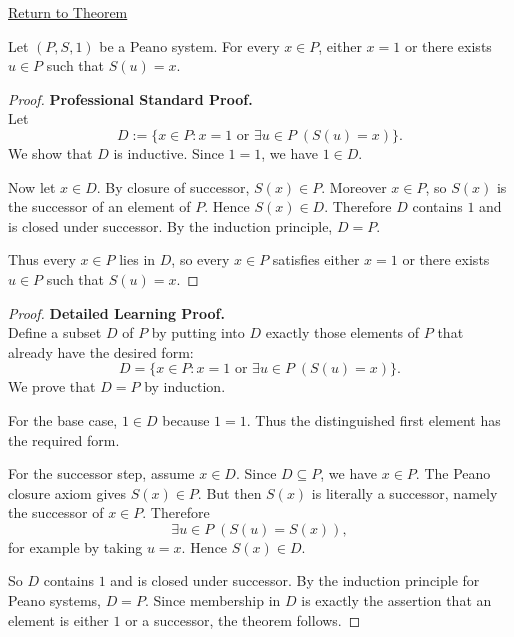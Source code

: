 \newpage
{}
\label{prf:every-element-is-one-or-a-successor}

\begin{remark*}[Return]
\hyperref[thm:every-element-is-one-or-a-successor]{Return to Theorem}
\end{remark*}

\begin{theorem*}
Let $(P,S,1)$ be a Peano system. For every $x \in P$, either $x=1$ or there
exists $u \in P$ such that $S(u)=x$.
\end{theorem*}

\begin{proof}
\textbf{Professional Standard Proof.}~\\
Let
\[
D:=\{x\in P:x=1 \text{ or } \exists u\in P\;(S(u)=x)\}.
\]
We show that $D$ is inductive. Since $1=1$, we have $1\in D$.

Now let $x\in D$. By closure of successor, $S(x)\in P$. Moreover $x\in P$,
so $S(x)$ is the successor of an element of $P$. Hence $S(x)\in D$.
Therefore $D$ contains $1$ and is closed under successor. By the induction
principle, $D=P$.

Thus every $x\in P$ lies in $D$, so every $x\in P$ satisfies either $x=1$ or
there exists $u\in P$ such that $S(u)=x$.
\end{proof}

\begin{proof}
\textbf{Detailed Learning Proof.}~\\
Define a subset $D$ of $P$ by putting into $D$ exactly those elements of $P$
that already have the desired form:
\[
D=\{x\in P:x=1 \text{ or } \exists u\in P\;(S(u)=x)\}.
\]
We prove that $D=P$ by induction.

For the base case, $1\in D$ because $1=1$. Thus the distinguished first
element has the required form.

For the successor step, assume $x\in D$. Since $D\subseteq P$, we have
$x\in P$. The Peano closure axiom gives $S(x)\in P$. But then $S(x)$ is
literally a successor, namely the successor of $x\in P$. Therefore
\[
\exists u\in P\;(S(u)=S(x)),
\]
for example by taking $u=x$. Hence $S(x)\in D$.

So $D$ contains $1$ and is closed under successor. By the induction principle
for Peano systems, $D=P$. Since membership in $D$ is exactly the assertion
that an element is either $1$ or a successor, the theorem follows.
\end{proof}

